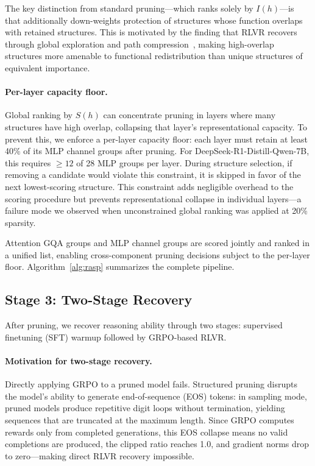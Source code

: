 The key distinction from standard pruning---which ranks solely by $I(h)$---is that \rasp{} additionally down-weights protection of structures whose function overlaps with retained structures.
This is motivated by the finding that RLVR recovers through global exploration and path compression~\citep{rlsqueezes2026}, making high-overlap structures more amenable to functional redistribution than unique structures of equivalent importance.

\paragraph{Per-layer capacity floor.}
Global ranking by $S(h)$ can concentrate pruning in layers where many structures have high overlap, collapsing that layer's representational capacity.
To prevent this, we enforce a per-layer capacity floor: each layer must retain at least 40\% of its MLP channel groups after pruning.
For DeepSeek-R1-Distill-Qwen-7B, this requires ${\ge}12$ of 28 MLP groups per layer.
During structure selection, if removing a candidate would violate this constraint, it is skipped in favor of the next lowest-scoring structure.
This constraint adds negligible overhead to the scoring procedure but prevents representational collapse in individual layers---a failure mode we observed when unconstrained global ranking was applied at 20\% sparsity.

Attention GQA groups and MLP channel groups are scored jointly and ranked in a unified list, enabling cross-component pruning decisions subject to the per-layer floor.
Algorithm~\ref{alg:rasp} summarizes the complete pipeline.

\subsection{Stage 3: Two-Stage Recovery}
\label{sec:stage3}

After pruning, we recover reasoning ability through two stages: supervised finetuning (SFT) warmup followed by GRPO-based RLVR.

\paragraph{Motivation for two-stage recovery.}
Directly applying GRPO to a pruned model fails.
Structured pruning disrupts the model's ability to generate end-of-sequence (EOS) tokens: in sampling mode, pruned models produce repetitive digit loops without termination, yielding sequences that are truncated at the maximum length.
Since GRPO computes rewards only from completed generations, this EOS collapse means no valid completions are produced, the clipped ratio reaches 1.0, and gradient norms drop to zero---making direct RLVR recovery impossible.

